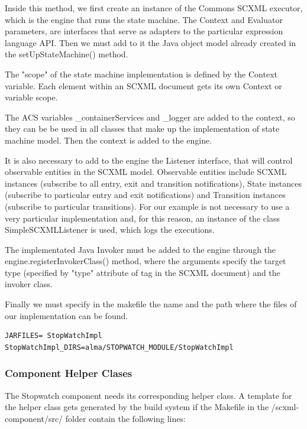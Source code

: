 \documentclass[]{article}
\begin{document}
Inside this method, we first create an instance of the Commons SCXML executor, which is the engine that runs the state machine. The Context and Evaluator parameters, are interfaces that serve as adapters to the particular expression language API. Then we must add to it the Java object model already created in the \textsf{setUpStateMachine()} method.

The "scope" of the state machine implementation is defined by the \textsf{Context} variable. Each element within an SCXML document gets its own \textsf{Context} or variable scope.

The ACS variables \textsf{\_containerServices} and \textsf{\_logger} are added to the context, so they can be be used in all classes that make up the implementation of state machine model. Then the context is added to the engine.

It is also necessary to add to the engine the Listener interface, that will control observable entities in the SCXML model. Observable entities include SCXML instances (subscribe to all entry, exit and transition notifications), State instances (subscribe to particular entry and exit notifications) and Transition instances (subscribe to particular transitions). For our example is not necessary to use a very particular implementation and, for this reason, an instance of the class \textsf{SimpleSCXMLListener} is used, which logs the executions.

The implementated Java Invoker must be added to the engine through the \textsf{engine.registerInvokerClass()} method, where the arguments specify the target type (specified by "type" attribute of tag in the SCXML document) and the invoker class.

Finally we must specify in the makefile the name and the path where the files of our implementation can be found. 

\begin{lstlisting}
JARFILES= StopWatchImpl
StopWatchImpl_DIRS=alma/STOPWATCH_MODULE/StopWatchImpl
\end{lstlisting}

\subsubsection{Component Helper Clases}

The Stopwatch component needs its corresponding helper class. A template for the helper class gets generated by the build system if the Makefile in the /scxml-component/src/ folder contain the following lines:
\end{document}
